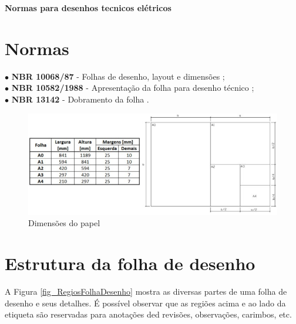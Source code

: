 \documentclass{article}
\begin{document}
\thispagestyle{empty} %


\begin{center}
\textbf{\Large{Normas para desenhos tecnicos elétricos}}    
\end{center}

\vspace{0.5cm}

\section{Normas}

$\bullet$ \hspace{0.1cm} \textbf{NBR 10068/87} - Folhas de desenho, layout e dimensões {\color{blue}\cite{NBR10068:1987}};\\
$\bullet$ \hspace{0.1cm} \textbf{NBR 10582/1988} - Apresentação da folha para desenho técnico {\color{blue}\cite{NBR10582:1988}};\\
$\bullet$ \hspace{0.1cm} \textbf{NBR 13142} - Dobramento da folha {\color{blue}\cite{NBR13142:1999}}.\\

\begin{figure} [H] %
\centering
\includegraphics[scale=0.65]{Fig/Figura_DimensoesDoPapel.png} 
\caption{Dimensões do papel}
\label{fig_DimensPapel}
\end{figure}

\section{Estrutura da folha de desenho}

\hspace{1cm} A Figura \ref{fig_RegiosFolhaDesenho} mostra as diversas partes de uma folha de desenho e seus detalhes. É possível observar que as regiões acima e ao lado da etiqueta são reservadas para anotações ded revisões, observações, carimbos, etc.
\end{document}
